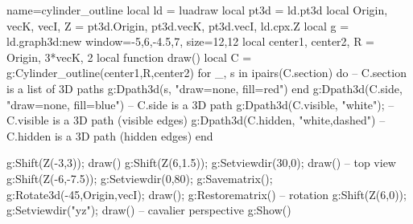 \documentclass[border=5pt]{standalone}%
\begin{document}
\begin{luadraw}{name=cylinder_outline}
local ld = luadraw
local pt3d = ld.pt3d
local Origin, vecK, vecI, Z = pt3d.Origin, pt3d.vecK, pt3d.vecI, ld.cpx.Z
local g = ld.graph3d:new{ window={-5,6,-4.5,7}, size={12,12}}
local center1, center2, R = Origin, 3*vecK, 2
local function draw()
    local C = g:Cylinder_outline(center1,R,center2)
    for _, s in ipairs(C.section)  do -- C.section is a list of 3D paths
        g:Dpath3d(s, "draw=none, fill=red") 
    end
    g:Dpath3d(C.side, "draw=none, fill=blue") -- C.side is a 3D path
    g:Dpath3d(C.visible, "white"); -- C.visible is a 3D path (visible edges)
    g:Dpath3d(C.hidden, "white,dashed") -- C.hidden is a 3D path (hidden edges)
end

g:Shift(Z(-3,3)); draw()
g:Shift(Z(6,1.5)); g:Setviewdir(30,0); draw() -- top view
g:Shift(Z(-6,-7.5)); g:Setviewdir(0,80); g:Savematrix(); g:Rotate3d(-45,{Origin,vecI}); draw(); g:Restorematrix() -- rotation
g:Shift(Z(6,0)); g:Setviewdir("yz"); draw() -- cavalier perspective
g:Show()
\end{luadraw}
\end{document}
